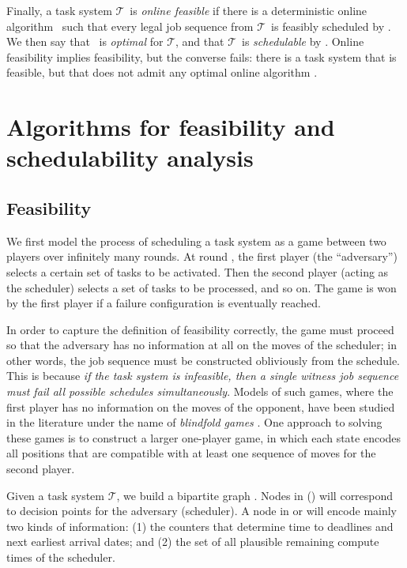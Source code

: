 \documentclass{llncs}
\newcommand{\tsys}{\ensuremath{\mathcal{T}}}
\begin{document}
Finally, a task system \tsys\ is \emph{online feasible} if there is a deterministic online algorithm \alg\ such that every legal job sequence from \tsys\ is feasibly scheduled by \alg. We then say that \alg\  is  \emph{optimal} for \tsys, and that \tsys\ is \emph{schedulable} by \alg.  
Online feasibility implies feasibility, but the converse fails: there is a task system that is feasible, but that does not admit any optimal online algorithm \cite{Fisher:2009}. 

\section{Algorithms for feasibility and schedulability analysis}
\label{sec:algorithms}


\subsection{Feasibility}
\label{sec:feas}
We first model the process of scheduling a task system as a game between two players over infinitely many rounds. At round , the first player (the ``adversary'') selects a certain set of tasks to be activated. Then the second player (acting as the scheduler) selects a set of tasks to be processed, and so on. The game is won by the first player if a failure configuration is eventually reached. 

In order to capture the definition of feasibility correctly, the game must proceed so that the adversary has no information at all on the moves of the scheduler; in other words, the job sequence must be constructed obliviously from the schedule. This is because \emph{if the task system is infeasible, then a single witness job sequence must fail all possible schedules simultaneously}. 
Models of such games, where the first player has no information on the moves of the opponent, have been studied in the literature under the name of \emph{blindfold games} \cite{Reif:1984}. One approach to solving these games is to construct a larger one-player game, in which each state encodes all positions that are compatible with at least one sequence of moves for the second player. 

Given a task system \tsys, we build a bipartite graph . Nodes in  () will correspond to decision points for the adversary (scheduler). A node in  or  will encode mainly two kinds of information: (1) the counters that determine time to deadlines and next earliest arrival dates; and (2) the set of all plausible remaining compute times of the scheduler. 
\end{document}
